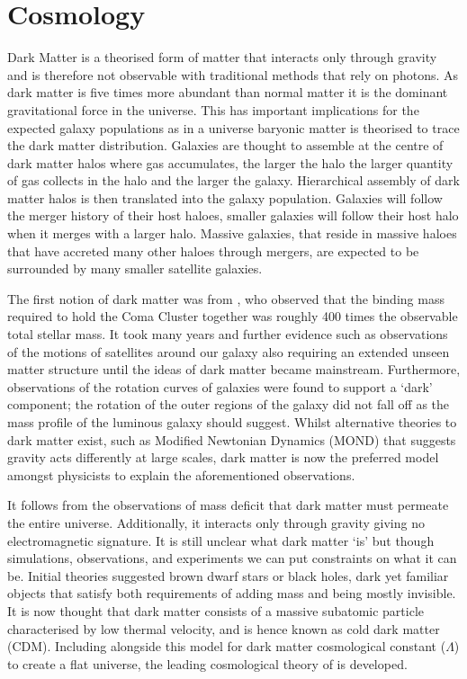 \section{\LCDM Cosmology}
\label{sec:introLCDM}
Dark Matter is a theorised form of matter that interacts only through gravity and is therefore not observable with traditional methods that rely on photons. As dark matter is five times more abundant than normal matter it is the dominant gravitational force in the universe. This has important implications for the expected galaxy populations as in a \LCDM universe baryonic matter is theorised to trace the dark matter distribution. Galaxies are thought to assemble at the centre of dark matter halos where gas accumulates, the larger the halo the larger quantity of gas collects in the halo and the larger the galaxy. Hierarchical assembly of dark matter halos is then translated into the galaxy population. Galaxies will follow the merger history of their host haloes, smaller galaxies will follow their host halo when it merges with a larger halo. Massive galaxies, that reside in massive haloes that have accreted many other haloes through mergers, are expected to be surrounded by many smaller satellite galaxies.

The first notion of dark matter was from \citet{Zwicky1933DieNebeln}, who observed that the binding mass required to hold the Coma Cluster together was roughly 400 times the observable total stellar mass. It took many years and further evidence such as observations of the motions of satellites around our galaxy also requiring an extended unseen matter structure until the ideas of dark matter became mainstream. Furthermore, observations of the rotation curves of galaxies \citep{Roberts1973ComparisonTypes} were found to support a `dark' component; the rotation of the outer regions of the galaxy did not fall off as the mass profile of the luminous galaxy should suggest. Whilst alternative theories to dark matter exist, such as Modified Newtonian Dynamics (MOND) that suggests gravity acts differently at large scales, dark matter is now the preferred model amongst physicists to explain the aforementioned observations. 

It follows from the observations of mass deficit that dark matter must permeate the entire universe. Additionally, it interacts only through gravity giving no electromagnetic signature. It is still unclear what dark matter `is' but though simulations, observations, and experiments we can put constraints on what it can be. Initial theories suggested brown dwarf stars or black holes, dark yet familiar objects that satisfy both requirements of adding mass and being mostly invisible. It is now thought that dark matter consists of a massive subatomic particle characterised by low thermal velocity, and is hence known as cold dark matter (CDM). Including alongside this model for dark matter cosmological constant ($\Lambda$) to create a flat universe, the leading cosmological theory of \LCDM is developed. 

